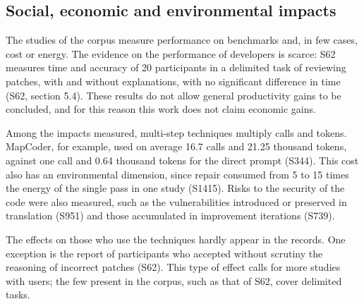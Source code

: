 \subsection{Social, economic and environmental impacts}
The studies of the corpus measure performance on benchmarks and, in few cases, cost or energy. The evidence on
the performance of developers is scarce: S62 measures time and accuracy of 20 participants in a delimited task of
reviewing patches, with and without explanations, with no significant difference in time (S62, section 5.4). These
results do not allow general productivity gains to be concluded, and for this reason this work does not claim economic
gains.

Among the impacts measured, multi-step techniques multiply calls and tokens. MapCoder, for
example, used on average 16.7 calls and 21.25 thousand tokens, against one call and 0.64 thousand tokens for the
direct prompt (S344).
This cost also has an environmental dimension, since repair consumed from 5 to 15 times the energy of the single pass in
one study (S1415). Risks to the security of the code were also measured, such as the vulnerabilities introduced
or preserved in translation (S951) and those accumulated in improvement iterations (S739).

The effects on those who use the techniques hardly appear in the records. One exception is the report of participants who
accepted without scrutiny the reasoning of incorrect patches (S62).
This type of effect calls for more studies with users; the few present in the corpus, such as that of S62, cover delimited
tasks.

